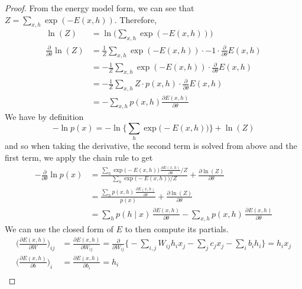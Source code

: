     \begin{proof}
      From the energy model form, we can see that $Z = \sum_{x, h} \exp(-E(x, h))$. Therefore, 
      \begin{align}
        \ln(Z) & = \ln \bigg( \sum_{x, h} \exp(-E(x, h)) \bigg) \\ 
        \frac{\partial}{\partial \theta} \ln(Z) & = \frac{1}{Z} \sum_{x, h} \exp(-E(x, h)) \cdot -1 \cdot \frac{\partial}{\partial \theta} E(x, h) \\
               & = -\frac{1}{Z} \sum_{x, h} \exp(-E(x, h)) \cdot \frac{\partial}{\partial \theta} E(x, h) \\
               & = -\frac{1}{Z} \sum_{x, h} Z \cdot p(x, h) \cdot \frac{\partial}{\partial \theta} E(x, h) \\
               & = - \sum_{x, h} p(x, h) \frac{\partial E(x, h)}{\partial \theta}
      \end{align}
      We have by definition 
      \begin{equation} 
        -\ln p(x) = - \ln \bigg\{ \sum_{h} \exp \big( -E(x, h) \big) \bigg\} + \ln(Z)
      \end{equation}
      and so when taking the derivative, the second term is solved from above and the first term, we apply the chain rule to get 
      \begin{align} 
        -\frac{\partial}{\partial \theta} \ln p(x) & = \frac{\sum_{h} \exp \big( -E(x, h) \big) \, \frac{\partial E(x, h)}{\partial \theta} / Z}{\sum_{h} \exp \big( -E (x, h) \big) / Z} + \frac{\partial \ln(Z)}{\partial \theta} \\
                                                                         & = \frac{\sum_{h} p(x, h) \, \frac{\partial E(x, h)}{\partial \theta}}{p(x)} + \frac{\partial \ln(Z)}{\partial \theta} \\
                                                                         & = \sum_{h} p(h \mid x) \, \frac{\partial E(x, h)}{\partial \theta} - \sum_{x, h} p(x, h) \, \frac{\partial E(x, h)}{\partial \theta} 
      \end{align} 
      We can use the closed form of $E$ to then compute its partials. 
      \begin{align}
        \bigg( \frac{\partial E(x, h)}{\partial W} \bigg)_{ij} & = \frac{\partial E(x, h)}{\partial W_{ij}} = \frac{\partial}{\partial W_{ij}} \bigg\{ - \sum_{i,j} W_{ij} h_i x_j - \sum_j c_j x_j - \sum_i b_i h_i \bigg\} = h_i x_j \\
        \bigg( \frac{\partial E(x, h)}{\partial b} \bigg)_i & = \frac{\partial E(x, h)}{\partial b_i} = h_i  \\

\end{align}
\end{proof}
